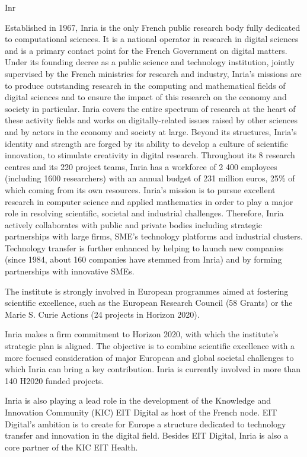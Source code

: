\begin{sitedescription}{Inr}


Established in 1967, Inria is the only French public research body fully dedicated to computational sciences. It is a national operator in research in digital sciences and is a primary contact point for the French Government on digital matters. Under its founding decree as a public science and technology institution, jointly supervised by the French ministries for research and industry, Inria's missions are to produce outstanding research in the computing and mathematical fields of digital sciences and to ensure the impact of this research on the economy and society in particular. Inria covers the entire spectrum of research at the heart of these activity fields and works on digitally-related issues raised by other sciences and by actors in the economy and society at large. Beyond its structures, Inria's identity and strength are forged by its ability to develop a culture of scientific innovation, to stimulate creativity in digital research.
Throughout its 8 research centres and its 220 project teams, Inria has a workforce of 2 400 employees (including 1600 researchers) with an annual budget of 231 million euros, 25\% of which coming from its own resources.
Inria’s mission is to pursue excellent research in computer science and applied mathematics in order to play a major role in resolving scientific, societal and industrial challenges. Therefore, Inria actively collaborates with public and private bodies including strategic partnerships with large firms, SME’s technology platforms and industrial clusters. Technology transfer is further enhanced by helping to launch new companies (since 1984, about 160 companies have stemmed from Inria) and by forming partnerships with innovative SMEs.

The institute is strongly involved in European programmes aimed at fostering scientific excellence, such as the European Research Council (58 Grants) or the Marie S. Curie Actions (24 projects in Horizon 2020).

Inria makes a firm commitment to Horizon 2020, with which the institute’s strategic plan is aligned. The objective is to combine scientific excellence with a more focused consideration of major European and global societal challenges to which Inria can bring a key contribution. Inria is currently involved in more than 140 H2020 funded projects.

Inria is also playing a lead role in the development of the Knowledge and Innovation Community (KIC) EIT Digital as host of the French node. EIT Digital’s ambition is to create for Europe a structure dedicated to technology transfer and innovation in the digital field. Besides EIT Digital, Inria is also a core partner of the KIC EIT Health.


\end{sitedescription}
